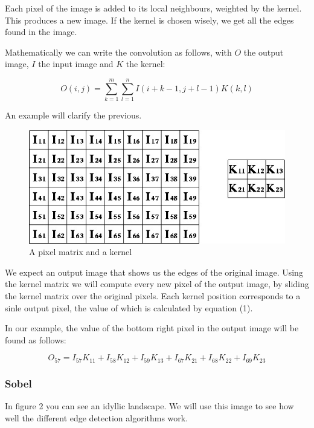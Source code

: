 \documentclass[12pt]{article}
\begin{document}
Each pixel of the image is added to its local neighbours, weighted by the kernel. This produces a new image. If the kernel is chosen wisely, we get all the edges found in the image.
\newline

Mathematically we can write the convolution as follows, with $O$ the output image, $I$ the input image and $K$ the kernel:

\begin{equation}
O(i, j) =  \sum\limits_{k=1}^m\sum\limits_{l=1}^n I(i + k - 1, j + l - 1)K(k,l)
\end{equation}
\newline

An example will clarify the previous.

\begin{figure}[h]
\centering
\includegraphics[scale = 0.5]{img/convolution}
\caption{A pixel matrix and a kernel}
\end{figure}

We expect an output image that shows us the edges of the original image. Using the kernel matrix we will compute every new pixel of the output image, by sliding the kernel matrix over the original pixels. Each kernel position corresponds to a sinle output pixel, the value of which is calculated by equation (1).

In our example, the value of the bottom right pixel in the output image will be found as follows:

\begin{equation}
O_{57} = I_{57}K_{11} + I_{58}K_{12} + I_{59}K_{13} + I_{67}K_{21} + I_{68}K_{22} + I_{69}K_{23}
\end{equation}

\subsubsection{Sobel}

In figure 2 you can see an idyllic landscape. We will use this image to see how well the different edge detection algorithms work.
\end{document}
